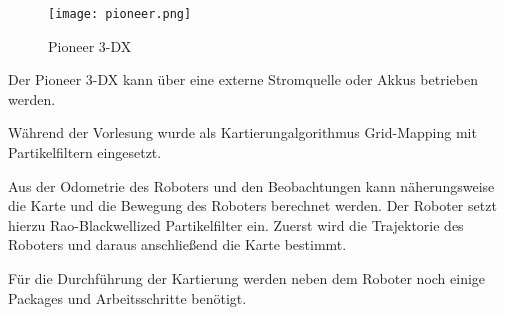 \begin{figure}[!htb]
	\centering
	\texttt{[image: pioneer.png]}
	\caption{Pioneer 3-DX}
	\label{fig:pioneer}
\end{figure}

Der Pioneer 3-DX kann über eine externe Stromquelle oder Akkus betrieben werden.\par
Während der Vorlesung wurde als Kartierungalgorithmus Grid-Mapping mit Partikelfiltern eingesetzt.\par
Aus der Odometrie des Roboters und den Beobachtungen kann näherungsweise die Karte und die Bewegung des Roboters berechnet werden. Der Roboter setzt hierzu Rao-Blackwellized Partikelfilter ein. Zuerst wird die Trajektorie des Roboters und daraus anschließend die Karte bestimmt. \cite{Grisetti2007}\par
Für die Durchführung der Kartierung werden neben dem Roboter noch einige Packages und Arbeitsschritte benötigt.


